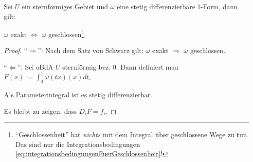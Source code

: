 \begin{theorem}[Pointcar\'e]
	Sei $U$ ein sternf\"ormiges Gebiet und $\omega$ eine stetig differenzierbare 1-Form, dann gilt:
	
	$\omega$ exakt $\Leftrightarrow$ $\omega$ geschlossen\footnote{``Geschlossenheit'' hat \textit{nichts} mit dem Integral \"uber geschlossene Wege zu tun. Das sind nur die Integrationsbedingungen \eqref{eq:integrationsbedingungenFuerGeschlossenheit}!}
\end{theorem}
\begin{proof}
	``$\Rightarrow$'': Nach dem Satz von Schwarz gilt: $\omega$ exakt $\Rightarrow$ $\omega$ geschlossen.
	
	``$\Leftarrow$'': Sei oBdA $U$ sternf\"ormig bez. $0$. Dann definiert man $F(x) := \int_0^1 \omega(tx)(x)dt$.
	
	Als Parameterintegral ist es stetig differenzierbar.
	
	Es bleibt zu zeigen, dass $D_i F = f_i$.	
\end{proof}












